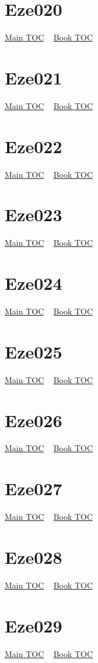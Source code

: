 \documentclass{book}
\begin{document}
  \section{Eze020}\hyperlink{toc}{Main TOC} ~ \hyperref[subsec:Eze]{Book TOC} 
  \section{Eze021}\hyperlink{toc}{Main TOC} ~ \hyperref[subsec:Eze]{Book TOC} 
  \section{Eze022}\hyperlink{toc}{Main TOC} ~ \hyperref[subsec:Eze]{Book TOC} 
  \section{Eze023}\hyperlink{toc}{Main TOC} ~ \hyperref[subsec:Eze]{Book TOC} 
  \section{Eze024}\hyperlink{toc}{Main TOC} ~ \hyperref[subsec:Eze]{Book TOC} 
  \section{Eze025}\hyperlink{toc}{Main TOC} ~ \hyperref[subsec:Eze]{Book TOC} 
  \section{Eze026}\hyperlink{toc}{Main TOC} ~ \hyperref[subsec:Eze]{Book TOC} 
  \section{Eze027}\hyperlink{toc}{Main TOC} ~ \hyperref[subsec:Eze]{Book TOC} 
  \section{Eze028}\hyperlink{toc}{Main TOC} ~ \hyperref[subsec:Eze]{Book TOC} 
  \section{Eze029}\hyperlink{toc}{Main TOC} ~ \hyperref[subsec:Eze]{Book TOC} 
\end{document}
